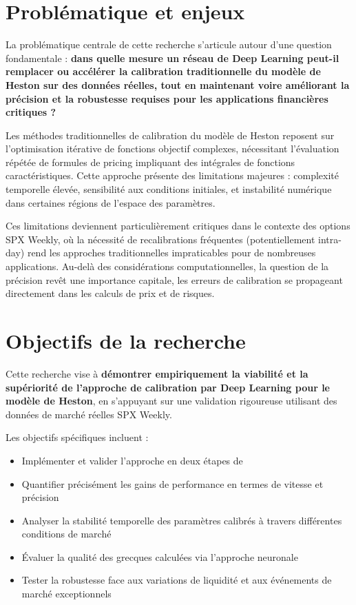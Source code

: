 \section{Problématique et enjeux}

La problématique centrale de cette recherche s'articule autour d'une question fondamentale : \textbf{dans quelle mesure un réseau de Deep Learning peut-il remplacer ou accélérer la calibration traditionnelle du modèle de Heston sur des données réelles, tout en maintenant voire améliorant la précision et la robustesse requises pour les applications financières critiques ?}

Les méthodes traditionnelles de calibration du modèle de Heston reposent sur l'optimisation itérative de fonctions objectif complexes, nécessitant l'évaluation répétée de formules de pricing impliquant des intégrales de fonctions caractéristiques. Cette approche présente des limitations majeures : complexité temporelle élevée, sensibilité aux conditions initiales, et instabilité numérique dans certaines régions de l'espace des paramètres.

Ces limitations deviennent particulièrement critiques dans le contexte des options SPX Weekly, où la nécessité de recalibrations fréquentes (potentiellement intra-day) rend les approches traditionnelles impraticables pour de nombreuses applications. Au-delà des considérations computationnelles, la question de la précision revêt une importance capitale, les erreurs de calibration se propageant directement dans les calculs de prix et de risques.

\section{Objectifs de la recherche}

Cette recherche vise à \textbf{démontrer empiriquement la viabilité et la supériorité de l'approche de calibration par Deep Learning pour le modèle de Heston}, en s'appuyant sur une validation rigoureuse utilisant des données de marché réelles SPX Weekly.

Les objectifs spécifiques incluent :
\begin{itemize}
\item Implémenter et valider l'approche en deux étapes de \citet{bayer2018deep}
\item Quantifier précisément les gains de performance en termes de vitesse et précision
\item Analyser la stabilité temporelle des paramètres calibrés à travers différentes conditions de marché
\item Évaluer la qualité des grecques calculées via l'approche neuronale
\item Tester la robustesse face aux variations de liquidité et aux événements de marché exceptionnels
\end{itemize}

